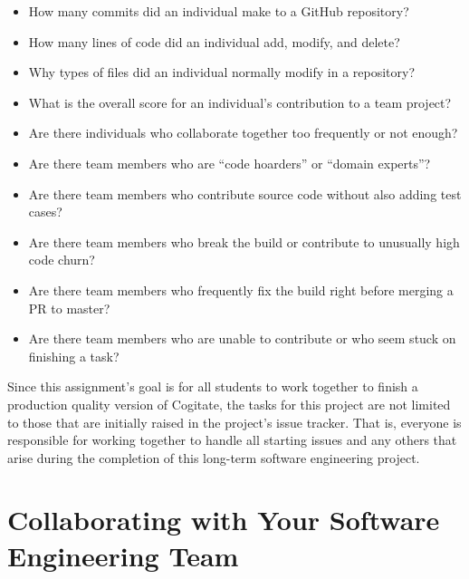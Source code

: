\documentclass[11pt]{article}
\begin{document}
\begin{itemize}

  \setlength{\itemsep}{0pt}

  \item How many commits did an individual make to a GitHub repository?

  \item How many lines of code did an individual add, modify, and delete?

  \item Why types of files did an individual normally modify in a repository?

  \item What is the overall score for an individual's contribution to a team
    project?

  \item Are there individuals who collaborate together too frequently or not
    enough?

  \item Are there team members who are ``code hoarders'' or ``domain
    experts''?

  \item Are there team members who contribute source code without also adding
    test cases?

  \item Are there team members who break the build or contribute to unusually
    high code churn?

  \item Are there team members who frequently fix the build right before merging
    a PR to master?

  \item Are there team members who are unable to contribute or who seem stuck on
    finishing a task?

\end{itemize}

\vspace*{-.5em}

Since this assignment's goal is for all students to work together to finish a
production quality version of Cogitate, the tasks for this project are not
limited to those that are initially raised in the project's issue tracker. That
is, everyone is responsible for working together to handle all starting issues
and any others that arise during the completion of this long-term software
engineering project.

\section*{Collaborating with Your Software Engineering Team}
\end{document}
